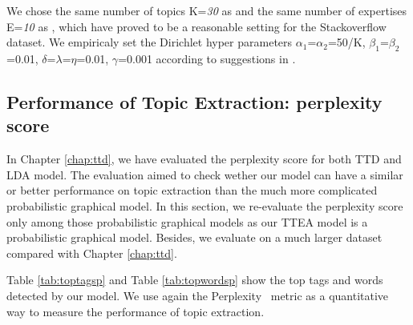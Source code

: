 {{{{{{{\begin{itemize}
\end{itemize}


We chose the same number of topics K=\textit{30} as \cite{Chang:2013} and the same number of expertises E=\textit{10} as \cite{yang2013cqarank}, which have proved to be a reasonable setting for the Stackoverflow dataset. We empiricaly set the Dirichlet hyper parameters $\alpha_1$=$\alpha_2$=50/K, $\beta_1$=$\beta_2$=0.01, $\delta$=$\lambda$=$\eta$=0.01, $\gamma$=0.001 according to suggestions in \cite{griffiths2004finding}. 


\subsection{Performance of Topic Extraction: perplexity score}


In Chapter \ref{chap:ttd}, we have evaluated the perplexity score for both TTD and LDA model. The evaluation aimed to check wether our model can have a similar or better performance on topic extraction than the much more complicated probabilistic graphical model. In this section, we re-evaluate the perplexity score only among those probabilistic graphical models as our TTEA model is a probabilistic graphical model. Besides, we evaluate on a much larger dataset compared with Chapter \ref{chap:ttd}.

Table \ref{tab:toptagsp} and Table \ref{tab:topwordsp} show the top tags and words detected by our model. We use again the Perplexity~\cite{blei2003latent} metric as a quantitative way to measure the performance of topic extraction.

}}}}}}}
